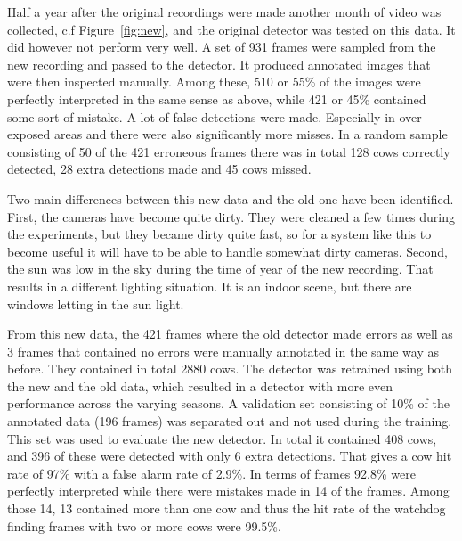 \documentclass{cta-author}
\begin{document}
Half a year after the original recordings were made another month of video was collected, c.f
Figure~\ref{fig:new}, and the original detector was tested on this data. It did however not perform very
well. A set of 931 frames were sampled from the new recording and passed to the detector. It produced
annotated images that were then inspected manually. Among these, 510 or 55\% of the images were perfectly
interpreted in the same sense as above, while 421 or 45\% contained some sort of mistake.
A lot of false detections were made. Especially in over exposed areas and there were also significantly
more misses. In a random sample consisting of 50 of the 421 erroneous frames there was in total 128 cows correctly detected, 28 extra detections made and 45 cows missed.

Two main differences between this new data and the old one have been identified.
First, the cameras have become quite dirty. They were cleaned a few times during the experiments, but they
became dirty quite fast, so for a system like this to become useful it will have to be able to handle
somewhat dirty cameras. Second, the sun was low in the sky during  the time of year of the new recording.
That results in a different lighting situation. It is an indoor scene, but there are windows letting in the
sun light.

From this new data, the 421 frames where the old detector made errors as well as 3 frames that contained no
errors were manually annotated in the same way as before. They contained in total 2880 cows. The detector was
retrained using both the new and the old data, which resulted in a detector with more even performance across
the varying seasons. A validation set consisting of 10\% of the annotated data (196 frames) was separated
out and not used during the training. This set was used to evaluate the new detector. In total it contained
408 cows, and 396 of these were detected with only 6 extra detections. That gives a cow hit rate of 97\%
with a false alarm rate of 2.9\%. In terms of frames 92.8\% were perfectly interpreted while there were
mistakes made in 14 of the frames. Among those 14, 13 contained more than one cow and thus the hit rate of
the watchdog finding frames with two or more cows were 99.5\%.
\end{document}

